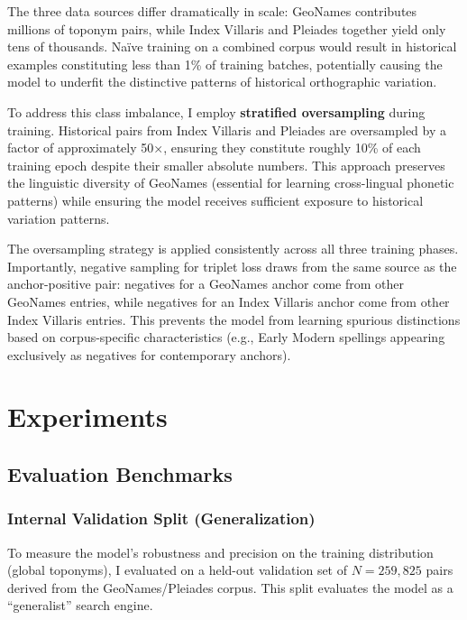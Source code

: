 \documentclass[11pt]{article}
\begin{document}
    The three data sources differ dramatically in scale: GeoNames contributes millions of toponym pairs, while Index Villaris and Pleiades together yield only tens of thousands. Na\"ive training on a combined corpus would result in historical examples constituting less than 1\% of training batches, potentially causing the model to underfit the distinctive patterns of historical orthographic variation.

    To address this class imbalance, I employ \textbf{stratified oversampling} during training. Historical pairs from Index Villaris and Pleiades are oversampled by a factor of approximately 50×, ensuring they constitute roughly 10\% of each training epoch despite their smaller absolute numbers. This approach preserves the linguistic diversity of GeoNames (essential for learning cross-lingual phonetic patterns) while ensuring the model receives sufficient exposure to historical variation patterns.

    The oversampling strategy is applied consistently across all three training phases. Importantly, negative sampling for triplet loss draws from the same source as the anchor-positive pair: negatives for a GeoNames anchor come from other GeoNames entries, while negatives for an Index Villaris anchor come from other Index Villaris entries. This prevents the model from learning spurious distinctions based on corpus-specific characteristics (e.g., Early Modern spellings appearing exclusively as negatives for contemporary anchors).



    \section{Experiments}
    \label{sec:experiments}

    \subsection{Evaluation Benchmarks}

    \subsubsection{Internal Validation Split (Generalization)}
    To measure the model's robustness and precision on the training distribution (global toponyms), I evaluated on a held-out validation set of $N=259,825$ pairs derived from the GeoNames/Pleiades corpus. This split evaluates the model as a ``generalist'' search engine.
\end{document}
